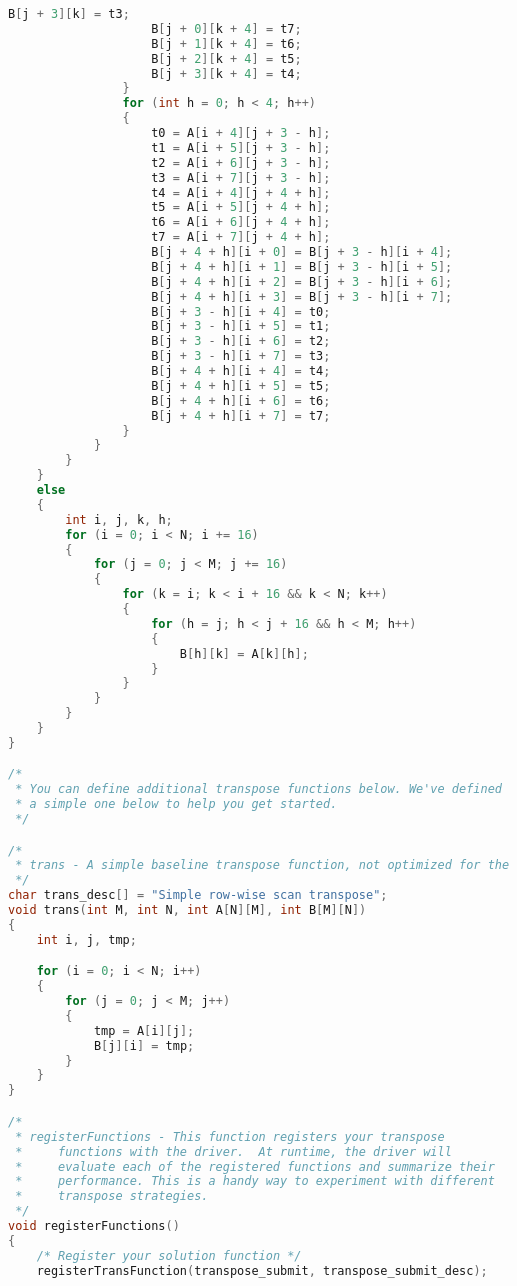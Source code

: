 \begin{lstlisting}[language = C,title= Coding in C]
                    B[j + 3][k] = t3;
                    B[j + 0][k + 4] = t7;
                    B[j + 1][k + 4] = t6;
                    B[j + 2][k + 4] = t5;
                    B[j + 3][k + 4] = t4;
                }
                for (int h = 0; h < 4; h++)
                {
                    t0 = A[i + 4][j + 3 - h];
                    t1 = A[i + 5][j + 3 - h];
                    t2 = A[i + 6][j + 3 - h];
                    t3 = A[i + 7][j + 3 - h];
                    t4 = A[i + 4][j + 4 + h];
                    t5 = A[i + 5][j + 4 + h];
                    t6 = A[i + 6][j + 4 + h];
                    t7 = A[i + 7][j + 4 + h];
                    B[j + 4 + h][i + 0] = B[j + 3 - h][i + 4];
                    B[j + 4 + h][i + 1] = B[j + 3 - h][i + 5];
                    B[j + 4 + h][i + 2] = B[j + 3 - h][i + 6];
                    B[j + 4 + h][i + 3] = B[j + 3 - h][i + 7];
                    B[j + 3 - h][i + 4] = t0;
                    B[j + 3 - h][i + 5] = t1;
                    B[j + 3 - h][i + 6] = t2;
                    B[j + 3 - h][i + 7] = t3;
                    B[j + 4 + h][i + 4] = t4;
                    B[j + 4 + h][i + 5] = t5;
                    B[j + 4 + h][i + 6] = t6;
                    B[j + 4 + h][i + 7] = t7;
                }
            }
        }
    }
    else
    {
        int i, j, k, h;
        for (i = 0; i < N; i += 16)
        {
            for (j = 0; j < M; j += 16)
            {
                for (k = i; k < i + 16 && k < N; k++)
                {
                    for (h = j; h < j + 16 && h < M; h++)
                    {
                        B[h][k] = A[k][h];
                    }
                }
            }
        }
    }
}

/*
 * You can define additional transpose functions below. We've defined
 * a simple one below to help you get started.
 */

/*
 * trans - A simple baseline transpose function, not optimized for the cache.
 */
char trans_desc[] = "Simple row-wise scan transpose";
void trans(int M, int N, int A[N][M], int B[M][N])
{
    int i, j, tmp;

    for (i = 0; i < N; i++)
    {
        for (j = 0; j < M; j++)
        {
            tmp = A[i][j];
            B[j][i] = tmp;
        }
    }
}

/*
 * registerFunctions - This function registers your transpose
 *     functions with the driver.  At runtime, the driver will
 *     evaluate each of the registered functions and summarize their
 *     performance. This is a handy way to experiment with different
 *     transpose strategies.
 */
void registerFunctions()
{
    /* Register your solution function */
    registerTransFunction(transpose_submit, transpose_submit_desc);


\end{lstlisting}
